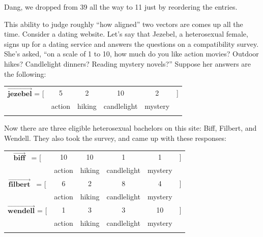 Dang, we dropped from 39 all the way to 11 just by reordering the entries. 

\label{matchmakerExample}

This ability to judge roughly ``how aligned'' two vectors are comes up all the
time. Consider a dating website. Let's say that Jezebel, a heterosexual female,
signs up for a dating service and answers the questions on a compatibility
survey. She's asked, ``on a scale of 1 to 10, how much do you like action
movies? Outdoor hikes? Candlelight dinners? Reading mystery novels?'' Suppose
her answers are the following:

\begin{center}
\begin{tabular}{cccccc}
$\overrightarrow{\textbf{jezebel}}$ = [ & 5 & 2 & 10 & 2 & ] \\
& \scriptsize{action} & \scriptsize{hiking} & \scriptsize{candlelight} &
\scriptsize{mystery} & \\
\normalsize
\end{tabular}
\end{center}
\vspace{-.15in}


Now there are three eligible heterosexual bachelors on this site: Biff,
Filbert, and Wendell. They also took the survey, and came up with these
responses:

\begin{center}
\begin{tabular}{cccccc}
$\overrightarrow{\textbf{biff}}$ \quad \ = [ & 10 & 10 & 1 & 1 & ] \\
& \scriptsize{action} & \scriptsize{hiking} & \scriptsize{candlelight} &
\scriptsize{mystery} & \medskip \\

$\overrightarrow{\textbf{filbert}}$ \ = [ & 6 & 2 & 8 & 4 & ] \\
& \scriptsize{action} & \scriptsize{hiking} & \scriptsize{candlelight} &
\scriptsize{mystery} & \medskip \\

$\overrightarrow{\textbf{wendell}}$ = [ & 1 & 3 & 3 & 10 & ] \\
& \scriptsize{action} & \scriptsize{hiking} & \scriptsize{candlelight} &
\scriptsize{mystery} & \\
\normalsize
\end{tabular}
\end{center}
\vspace{-.15in}

